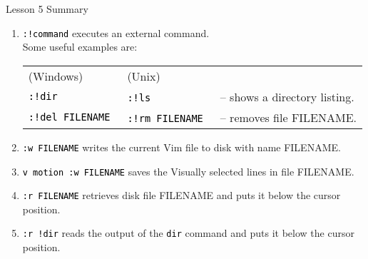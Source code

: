 \documentclass[handout, 10pt]{beamer}
\newcommand{\code}[2][black]{\textcolor{#1}{\colorbox{codegray}{\texttt{#2}}}}
\begin{document}
\begin{frame}{Lesson 5 Summary}
	\begin{enumerate}
		\item \code{:!command} executes an external command. \\[6pt]
		Some useful examples are:
		\begin{table}
			\begin{tabular}{lll}
				(Windows) & ~(Unix) & \\
				\code{:!dir} & ~\code{:!ls} & ~-- shows a directory listing. \\
				\code{:!del FILENAME} & ~\code{:!rm FILENAME} & ~-- removes
				file FILENAME.
			\end{tabular}
		\end{table}

		\item \code{:w FILENAME} writes the current Vim file to disk with name
			FILENAME.

		\item \code{v  motion  :w FILENAME} saves the Visually selected lines
			in file FILENAME.

		\item \code{:r FILENAME}  retrieves disk file FILENAME and puts it
			below the cursor position.

		\item \code{:r !dir}  reads the output of the \code{dir} command and
			puts it below the cursor position.
	\end{enumerate}
\end{frame}
\end{document}
